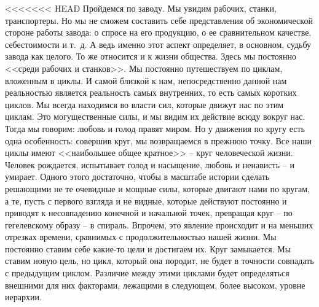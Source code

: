\documentclass{book}
\begin{document}
<<<<<<< HEAD
Пройдемся по заводу. Мы увидим рабочих, станки, транспор­теры. Но мы не сможем составить себе представления об экономической стороне работы завода: о спросе на его продукцию, о ее сравнительном качестве, себестоимости и т.~д. А ведь именно этот аспект определяет, в основном, судьбу завода как целого. То же относится и к жизни общества. Здесь мы постоянно <<среди рабочих и станков>>. Мы постоянно путешествуем по циклам, вложенным в циклы. И самой близкой к нам, непос­редственно данной нам реальностью является реальность самых внутренних, то есть самых коротких циклов. Мы всегда нахо­димся во власти сил, которые движут нас по этим циклам. Это могущественные силы, и мы видим их действие всюду вокруг нас. Тогда мы говорим: любовь и голод правят миром. Но у движения по кругу есть одна особенность: совершив круг, мы возвращаемся в прежнюю точку. Все наши циклы имеют <<наибольшее общее кратное>> -- круг человеческой жизни. Человек рождается, испытывает голод и насыщение, любовь и нена­висть -- и умирает. Одного этого достаточно, чтобы в масштабе истории сделать решающими не те очевидные и мощные силы, которые двигают нами по кругам, а те, пусть с первого взгляда и не видные, которые действуют постоянно и приводят к несовпадению конечной и начальной точек, превращая круг -- по гегелевскому образу -- в спираль. Впрочем, это явление происходит и на меньших отрезках времени, сравнимых с про­должительностью нашей жизни. Мы постоянно ставим себе ка­кие‑то цели и достигаем их. Круг замыкается. Мы ставим новую цель, но цикл, который она породит, не будет в точности сов­падать с предыдущим циклом. Различие между этими циклами будет определяться внешними для них факторами, лежащими в следующем, более высоком, уровне иерархии.
\end{document}
